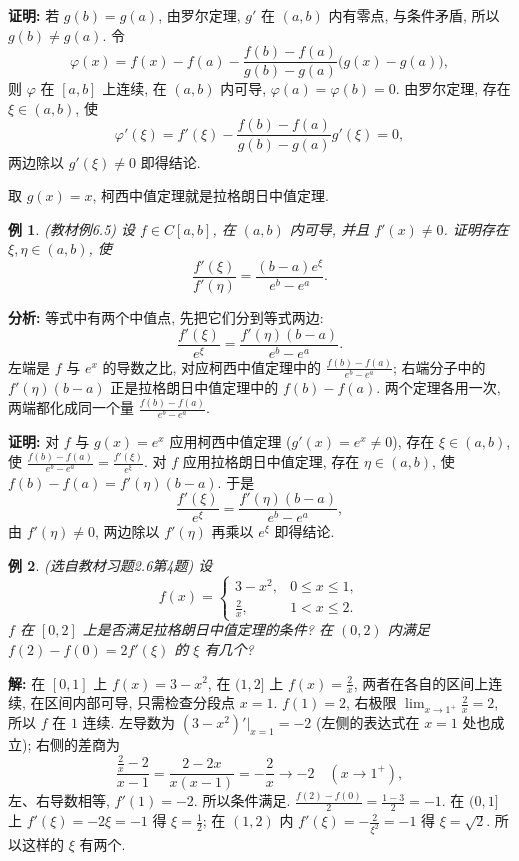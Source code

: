 \documentclass[UTF8,openany]{ctexbook}
\theoremstyle{chinesetextbook}
\newtheorem{example}{例}[section]
\newenvironment{cnproof}{\par\indent\textbf{证明:} \ignorespaces}{\par}
\newenvironment{cnsolution}{\par\indent\textbf{解:} \ignorespaces}{\par}
\begin{document}
\begin{cnproof}
若 $g(b)=g(a)$, 由罗尔定理, $g'$ 在 $(a,b)$ 内有零点, 与条件矛盾, 所以 $g(b)\ne g(a)$. 令
\[
\varphi(x)=f(x)-f(a)-\frac{f(b)-f(a)}{g(b)-g(a)}\bigl(g(x)-g(a)\bigr),
\]
则 $\varphi$ 在 $[a,b]$ 上连续, 在 $(a,b)$ 内可导, $\varphi(a)=\varphi(b)=0$. 由罗尔定理, 存在 $\xi\in(a,b)$, 使
\[
\varphi'(\xi)=f'(\xi)-\frac{f(b)-f(a)}{g(b)-g(a)}g'(\xi)=0,
\]
两边除以 $g'(\xi)\ne0$ 即得结论.
\end{cnproof}
取 $g(x)=x$, 柯西中值定理就是拉格朗日中值定理.
\begin{example}\label{ex:c2-6-5}
\textnormal{(教材例6.5)} 设 $f\in C[a,b]$, 在 $(a,b)$ 内可导, 并且 $f'(x)\ne0$. 证明存在 $\xi,\eta\in(a,b)$, 使
\[
\frac{f'(\xi)}{f'(\eta)}=\frac{(b-a)e^\xi}{e^b-e^a}.
\]
\end{example}
\par\indent\textbf{分析:} 等式中有两个中值点, 先把它们分到等式两边:
\[
\frac{f'(\xi)}{e^\xi}=\frac{f'(\eta)(b-a)}{e^b-e^a}.
\]
左端是 $f$ 与 $e^x$ 的导数之比, 对应柯西中值定理中的 $\displaystyle\frac{f(b)-f(a)}{e^b-e^a}$; 右端分子中的 $f'(\eta)(b-a)$ 正是拉格朗日中值定理中的 $f(b)-f(a)$. 两个定理各用一次, 两端都化成同一个量 $\displaystyle\frac{f(b)-f(a)}{e^b-e^a}$.
\begin{cnproof}
对 $f$ 与 $g(x)=e^x$ 应用柯西中值定理 ($g'(x)=e^x\ne0$), 存在 $\xi\in(a,b)$, 使 $\displaystyle\frac{f(b)-f(a)}{e^b-e^a}=\frac{f'(\xi)}{e^\xi}$. 对 $f$ 应用拉格朗日中值定理, 存在 $\eta\in(a,b)$, 使 $f(b)-f(a)=f'(\eta)(b-a)$. 于是
\[
\frac{f'(\xi)}{e^\xi}=\frac{f'(\eta)(b-a)}{e^b-e^a},
\]
由 $f'(\eta)\ne0$, 两边除以 $f'(\eta)$ 再乘以 $e^\xi$ 即得结论.
\end{cnproof}
\begin{example}\label{ex:c2-h6-4}
\textnormal{(选自教材习题2.6第4题)} 设
\[
f(x)=\begin{cases}3-x^2,&0\le x\le1,\\\frac2x,&1<x\le2.\end{cases}
\]
$f$ 在 $[0,2]$ 上是否满足拉格朗日中值定理的条件? 在 $(0,2)$ 内满足 $f(2)-f(0)=2f'(\xi)$ 的 $\xi$ 有几个?
\end{example}
\begin{cnsolution}
在 $[0,1]$ 上 $f(x)=3-x^2$, 在 $(1,2]$ 上 $\displaystyle f(x)=\frac2x$, 两者在各自的区间上连续, 在区间内部可导, 只需检查分段点 $x=1$. $f(1)=2$, 右极限 $\displaystyle\lim_{x\to1^+}\frac2x=2$, 所以 $f$ 在 $1$ 连续. 左导数为 $(3-x^2)'\big|_{x=1}=-2$ (左侧的表达式在 $x=1$ 处也成立); 右侧的差商为
\[
\frac{\frac2x-2}{x-1}=\frac{2-2x}{x(x-1)}=-\frac2x\to-2\quad(x\to1^+),
\]
左、右导数相等, $f'(1)=-2$. 所以条件满足. $\displaystyle\frac{f(2)-f(0)}2=\frac{1-3}2=-1$. 在 $(0,1]$ 上 $f'(\xi)=-2\xi=-1$ 得 $\displaystyle\xi=\frac12$; 在 $(1,2)$ 内 $\displaystyle f'(\xi)=-\frac2{\xi^2}=-1$ 得 $\xi=\sqrt2$. 所以这样的 $\xi$ 有两个.
\end{cnsolution}
\end{document}
